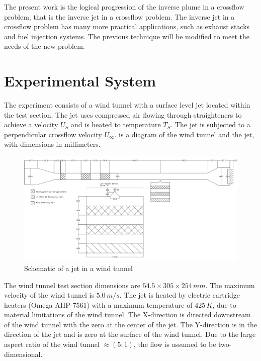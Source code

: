 \documentclass[preprint,12pt]{elsarticle}
\begin{document}
The present work is the logical progression of the inverse plume in a crossflow problem, that is the inverse jet in a crossflow problem.  The inverse jet in a crossflow problem has many more practical applications, such as exhaust stacks and fuel injection systems.  The previous technique will be modified to meet the needs of the new problem.


\section{Experimental System}
The experiment consists of a wind tunnel with a surface level jet located within the test section.  The jet uses compressed air flowing through straighteners to achieve a velocity $U_S$ and is heated to temperature $T_S$.  The jet is subjected to a perpendicular crossflow velocity $U_{\infty}$.   is a diagram of the wind tunnel and the jet, with dimensions in millimeters.

\begin{figure}[!tbp]
\begin{center}
\includegraphics[scale=.30]{windtunneljet.jpg}
\caption{Schematic of a jet in a wind tunnel}
\label{fig:diagramjet}
\end{center}
\end{figure}

The wind tunnel test section dimensions are $54.5\times305\times 254\,mm$.  The maximum velocity of the wind tunnel is $5.0\,m/s$.  The jet is heated by electric cartridge heaters (Omega AHP-7561) with a maximum temperature of $425\,K$, due to material limitations of the wind tunnel.  The X-direction is directed downstream of the wind tunnel with the zero at the center of the jet.  The Y-direction is in the direction of the jet and is zero at the surface of the wind tunnel.  Due to the large aspect ratio of the wind tunnel $\approx\left(5:1\right)$, the flow is assumed to be two-dimensional.
\end{document}

